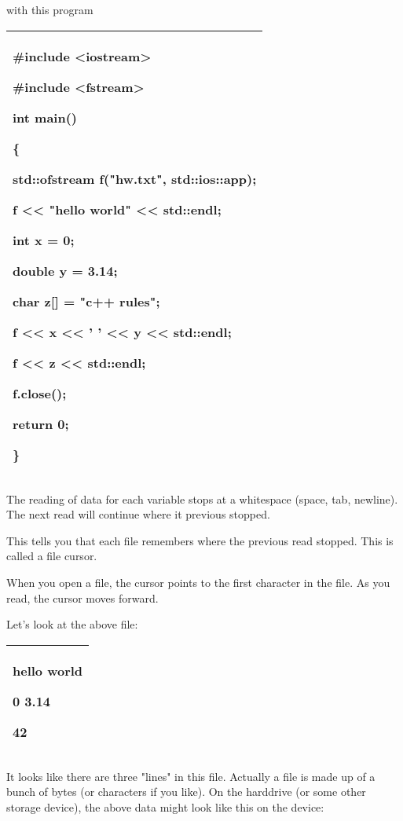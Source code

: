 \documentclass[
]{article}
\begin{document}
with this program

\begin{longtable}[]{@{}l@{}}
\toprule
\endhead
\begin{minipage}[t]{0.97\columnwidth}\raggedright
\#include \textless iostream\textgreater{}

\#include \textless fstream\textgreater{}

int main()

\{

std::ofstream f("hw.txt", std::ios::app);

f \textless\textless{} "hello world" \textless\textless{} std::endl;

int x = 0;

double y = 3.14;

char z{[}{]} = "c++ rules";

f \textless\textless{} x \textless\textless{} ' ' \textless\textless{} y
\textless\textless{} std::endl;

f \textless\textless{} z \textless\textless{} std::endl;

f.close();

return 0;

\}\strut
\end{minipage}\tabularnewline
\bottomrule
\end{longtable}

The reading of data for each variable stops at a whitespace (space, tab,
newline). The next read will continue where it previous stopped.

This tells you that each file remembers where the previous read stopped.
This is called a file cursor.

When you open a file, the cursor points to the first character in the
file. As you read, the cursor moves forward.

Let's look at the above file:

\begin{longtable}[]{@{}l@{}}
\toprule
\endhead
\begin{minipage}[t]{0.97\columnwidth}\raggedright
hello world

0 3.14

42\strut
\end{minipage}\tabularnewline
\bottomrule
\end{longtable}

It looks like there are three "lines" in this file. Actually a file is
made up of a bunch of bytes (or characters if you like). On the
harddrive (or some other storage device), the above data might look like
this on the device:
\end{document}
